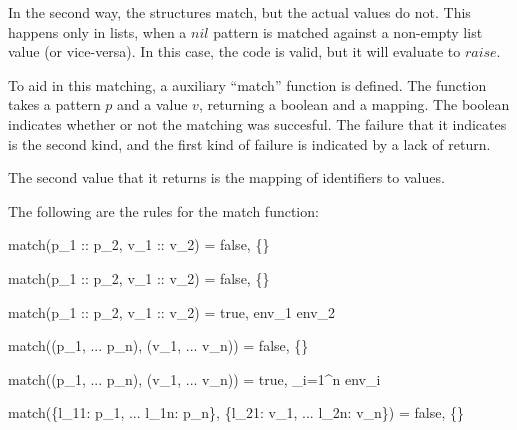 \documentclass{article}
\begin{document}
In the second way, the structures match, but the actual values do not.
This happens only in lists, when a $nil$ pattern is matched against a non-empty list value (or vice-versa).
In this case, the code is valid, but it will evaluate to $raise$.

\medskip

To aid in this matching, a auxiliary ``match'' function is defined.
The function takes a pattern $p$ and a value $v$, returning a boolean and a mapping.
The boolean indicates whether or not the matching was succesful.
The failure that it indicates is the second kind, and the first kind of failure is indicated by a lack of return.

The second value that it returns is the mapping of identifiers to values.

The following are the rules for the match function:



\smallskip



\smallskip


    {match(p_1 :: p_2, v_1 :: v_2) = false, \{\}}

    {match(p_1 :: p_2, v_1 :: v_2) = false, \{\}}

    {match(p_1 :: p_2, v_1 :: v_2) = true, env_1 \cup env_2}

\smallskip

    {match((p_1, ... p_n), (v_1, ... v_n)) = false, \{\}}

    {match((p_1, ... p_n), (v_1, ... v_n)) = true, \displaystyle\bigcup_{i=1}^{n} env_i}

\smallskip

    {match(\{l_{11}: p_1, ... l_{1n}: p_n\}, \{l_{21}: v_1, ... l_{2n}: v_n\}) = false, \{\}}
\end{document}
